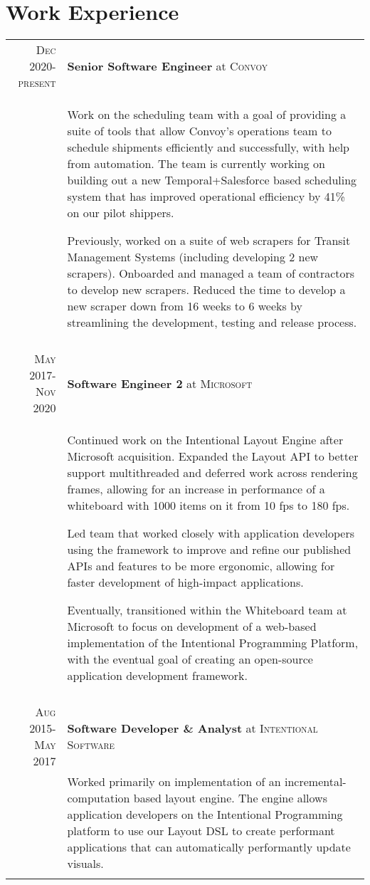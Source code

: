 \documentclass[letterpaper,10pt]{article} %
\newcommand{\work}[4]{ \textsc{#1} & \textbf{#2} at \textsc{#3}\\
& #4\\
\multicolumn{2}{c}{} \\}
\begin{document}
\section{Work Experience}

\begin{tabular}{r|p{14.5cm}} %


\work{Dec 2020-present}{Senior Software Engineer}{Convoy}{
 Work on the scheduling team with a goal of providing a suite of tools that allow Convoy's operations team to schedule shipments efficiently and successfully, with help from automation. The team is currently working on building out a new Temporal+Salesforce based scheduling system that has improved operational efficiency by 41\% on our pilot shippers.

Previously, worked on a suite of web scrapers for Transit Management Systems (including developing 2 new scrapers). Onboarded and managed a team of contractors to develop new scrapers. Reduced the time to develop a new scraper down from 16 weeks to 6 weeks by streamlining the development, testing and release process.
}


\work{May 2017-Nov 2020}{Software Engineer 2}{Microsoft}{
  Continued work on the Intentional Layout Engine after Microsoft acquisition. Expanded the Layout API to better support multithreaded and deferred work across rendering frames, allowing for an increase in performance of a whiteboard with 1000 items on it from 10 fps to 180 fps.

  Led team that worked closely with application developers using the framework to improve and refine our published APIs and features to be more ergonomic, allowing for faster development of high-impact applications.

Eventually, transitioned within the Whiteboard team at Microsoft to focus on development of a web-based implementation of the Intentional Programming Platform, with the eventual goal of creating an open-source application development framework.
}


\work{Aug 2015-May 2017}{Software Developer \& Analyst}{Intentional Software}{
  Worked primarily on implementation of an incremental-computation based layout engine. The engine allows application developers on the Intentional Programming
  platform to use our Layout DSL to create performant applications that can automatically performantly update visuals. 

}
\end{tabular}
\end{document}

